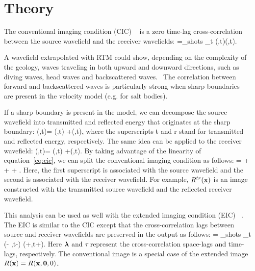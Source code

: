 \section{Theory}
The conventional imaging condition (CIC) ~\citep{Claerbout:1985:IEI:3887}
is a zero time-lag cross-correlation between the source wavefield and the 
receiver wavefields:
%
\beq
\R=\sum_{shots} \sum_{t} \US(\xx,t)\UR(\xx,t).
\label{eq:cic}
\eeq

A wavefield extrapolated with RTM could show, depending on the complexity of the geology, waves traveling in both
upward and downward directions, such as diving waves, head waves and backscattered waves.~
The correlation between forward and backscattered waves is particularly strong when
sharp boundaries are present in the velocity model (e.g. for salt bodies).

If a sharp boundary is present in the model, we can decompose the source wavefield into transmitted 
 and reflected energy that originates at the sharp boundary:
%
\beq
\US(\xx,t)= \USr(\xx,t) +\USt(\xx,t),
\label{eq:ssplit}
\eeq
%
where the superscripts t and r stand for transmitted and reflected energy, respectively. 
The same idea can be applied to the receiver wavefield:
%
\beq
\UR(\xx,t)= \URr(\xx,t) +\URt(\xx,t).
\label{eq:rsplit}
\eeq
%
By taking advantage of the linearity of equation~\ref{eq:cic},  we
can split the conventional imaging condition as follows:
%
\beq
 \R =  + + + .
\label{eq:cicsplit}
\eeq
%
Here, the first superscript is associated with the source wavefield and the second is associated with the
receiver wavefield. For example, $R^{tr}({\bf x})$ is an image constructed with the transmitted source wavefield
and the reflected receiver wavefield.

This analysis can be used as well with the extended imaging condition (EIC)
~\citep{rickett:883,sava:S209,GPR:GPR888}. The EIC is similar to the CIC except that the cross-correlation
lags between source and receiver wavefields are preserved in the output as follows:
\beq
\Re= \sum_{shots} \sum_{t} \US(\xx - \hh,t-\tau) \UR(\xx+\hh,t+\tau).
\label{eq:eic}
\eeq
Here ${\boldsymbol{\lambda}}$ and $\tau$ represent the cross-correlation space-lags and time-lags, respectively.
%
The conventional image is a special case of the extended image $R({\bf x})=R({\bf x},{\bf 0},0)$.

